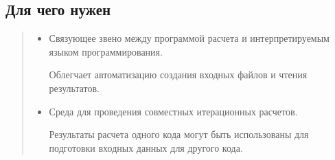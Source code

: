 \documentclass[a4paper]{article}
\begin{document}
\subsection{Для чего нужен%
  \label{id3}%
}
%
\begin{quote}
%
\begin{itemize}

\item Связующее звено между программой расчета и интерпретируемым языком программирования.

Облегчает автоматизацию создания входных файлов и чтения результатов.

\item Среда для проведения совместных итерационных расчетов.

Результаты расчета одного кода могут быть использованы для подготовки входных данных
для другого кода.

\end{itemize}

\end{quote}
\end{document}
